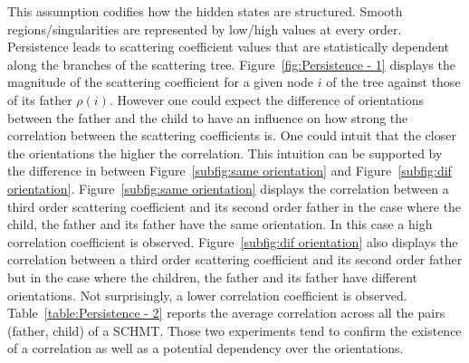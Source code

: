 \documentclass[a4paper,11pt]{report}
\begin{document}
		This assumption codifies how the hidden states are structured. Smooth regions/singularities are represented by low/high values at every order. Persistence leads to scattering coefficient values that are statistically dependent along the branches of the scattering tree. Figure~\ref{fig:Persistence - 1} displays the magnitude of the scattering coefficient for a given node $i$ of the tree against those of its father $\rho(i)$. However one could expect the difference of orientations between the father and the child to have an influence on how strong the correlation between the scattering coefficients is. One could intuit that the closer the orientations the higher the correlation. This intuition can be supported by the difference in between Figure~\ref{subfig:same orientation} and Figure~\ref{subfig:dif orientation}. Figure~\ref{subfig:same orientation} displays the correlation between a third order scattering coefficient and its second order father in the case where the child, the father and its father have the same orientation. In this case a high correlation coefficient is observed. Figure~\ref{subfig:dif orientation} also displays the correlation between a third order scattering coefficient and its second order father but in the case where the children, the father and its father have different orientations. Not surprisingly, a lower correlation coefficient is observed. Table~\ref{table:Persistence - 2} reports the average correlation across all the pairs (father, child) of a SCHMT. Those two experiments tend to confirm the existence of a correlation  as well as a potential dependency over the orientations. 
		
\end{document}
